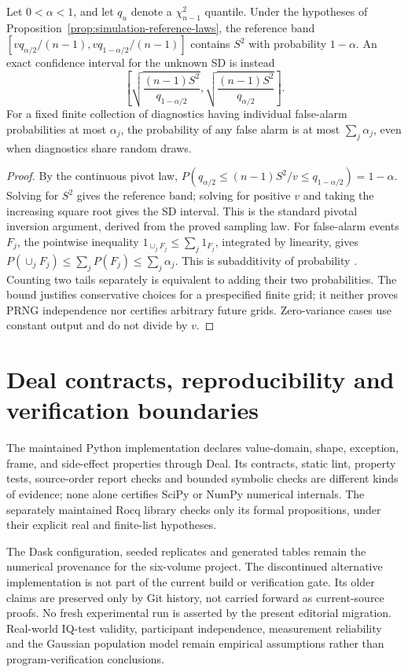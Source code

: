 \begin{corollary}
\label{cor:simulation-diagnostic-coverage}
Let \(0<\alpha<1\), and let \(q_u\) denote a \(\chi^2_{n-1}\) quantile.
Under the hypotheses
of Proposition~\ref{prop:simulation-reference-laws}, the reference band
\([vq_{\alpha/2}/(n-1),vq_{1-\alpha/2}/(n-1)]\) contains \(S^2\)
with probability \(1-\alpha\). An exact confidence interval for the
unknown SD is instead
\[
 \left[\sqrt{\frac{(n-1)S^2}{q_{1-\alpha/2}}},
       \sqrt{\frac{(n-1)S^2}{q_{\alpha/2}}}\right].
\]
For a fixed finite collection of diagnostics having individual false-alarm
probabilities at most \(\alpha_j\), the probability of any false alarm
is at most \(\sum_j\alpha_j\), even when diagnostics share random draws.
\end{corollary}
\begin{proof}
By the continuous pivot law,
\(P(q_{\alpha/2}\leq(n-1)S^2/v\leq q_{1-\alpha/2})=1-\alpha\).
Solving for \(S^2\) gives the reference band; solving for positive \(v\)
and taking the increasing square root gives the SD interval. This is the
standard pivotal inversion argument, derived from the proved sampling law.
For false-alarm events \(F_j\), the pointwise inequality
\(1_{\cup_jF_j}\leq\sum_j1_{F_j}\), integrated by linearity, gives
\(P(\cup_jF_j)\leq\sum_jP(F_j)\leq\sum_j\alpha_j\). This is
subadditivity of probability \citep[Section 1.1]{durrett2019}. Counting
two tails separately is equivalent to adding their two probabilities.
The bound justifies conservative choices for a prespecified finite grid;
it neither proves PRNG independence nor certifies arbitrary future grids.
Zero-variance cases use constant output and do not divide by \(v\).
\end{proof}

\section{Deal contracts, reproducibility and verification boundaries}
The maintained Python implementation declares value-domain,
shape, exception, frame, and side-effect properties through Deal.
Its contracts, static lint, property tests, source-order report
checks and bounded symbolic checks are different kinds of
evidence; none alone certifies SciPy or NumPy numerical internals.
The separately maintained Rocq library checks only its formal
propositions, under their explicit real and finite-list hypotheses.

The Dask configuration, seeded replicates and generated tables
remain the numerical provenance for the six-volume project.
The discontinued alternative implementation is not part of the
current build or verification gate. Its older claims are preserved
only by Git history, not carried forward as current-source proofs.
No fresh experimental run is asserted by the present editorial
migration. Real-world IQ-test validity, participant independence,
measurement reliability and the Gaussian population model remain
empirical assumptions rather than program-verification conclusions.

